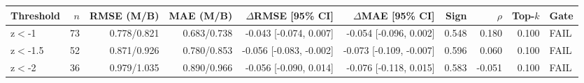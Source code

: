 \begin{tabular}{lrrrrrrrrl}
\toprule
Threshold & $n$ & RMSE (M/B) & MAE (M/B) & $\Delta$RMSE [95\% CI] & $\Delta$MAE [95\% CI] & Sign & $\rho$ & Top-$k$ & Gate \\
\midrule
z$<$-1 & 73 & 0.778/0.821 & 0.683/0.738 & -0.043 [-0.074, 0.007] & -0.054 [-0.096, 0.002] & 0.548 & 0.180 & 0.100 & FAIL \\
z$<$-1.5 & 52 & 0.871/0.926 & 0.780/0.853 & -0.056 [-0.083, -0.002] & -0.073 [-0.109, -0.007] & 0.596 & 0.060 & 0.100 & FAIL \\
z$<$-2 & 36 & 0.979/1.035 & 0.890/0.966 & -0.056 [-0.090, 0.014] & -0.076 [-0.118, 0.015] & 0.583 & -0.051 & 0.100 & FAIL \\
\bottomrule
\end{tabular}
